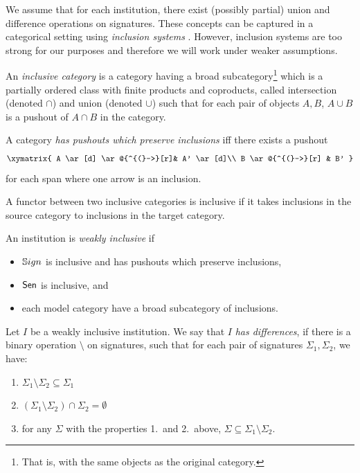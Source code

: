 \documentclass[10pt,fleqn,%
\ifpretendfinal
final%
\else
draft%
\fi,
]{scrreprt}
\begin{document}
We assume that for each institution, there exist (possibly partial) union and difference operations on signatures.
These concepts can be captured in a categorical setting using \emph{inclusion systems} \cite{Diaconescu1993}.
However, inclusion systems are too strong for our purposes and therefore we will work under weaker assumptions.

\begin{definition}  
 An \emph{inclusive category} \cite{DBLP:conf/birthday/GoguenR04} 
 is a category having a broad subcategory\footnote{That is, with the same objects as the original category.}
which is a partially ordered class with finite products and coproducts, called intersection (denoted $\cap$) and union
(denoted $\cup$) such that for each pair of objects $A, B$, $A \cup B$ is a pushout of $A \cap B$ in the category.
 \end{definition}

\noindent
A category \emph{has pushouts which preserve inclusions} iff 
there exists a pushout
$$
\xymatrix{
  A  \ar[d] \ar@{^{(}->}[r]& A' \ar[d]\\
  B \ar@{^{(}->}[r] & B'
}
$$ for each span where one arrow is an inclusion.

A functor between two inclusive categories is inclusive if it takes inclusions in the source category to inclusions in the target category.

\begin{definition}
 An institution is \emph{weakly inclusive} if
   \begin{itemize}
     \item $\mathbb{S}ign$ is inclusive and has pushouts which preserve inclusions,
     \item $\mathsf{Sen}$ is inclusive, and
     \item each model category have a broad subcategory of inclusions.
   \end{itemize}
\end{definition}

Let $I$ be a weakly inclusive institution. We say that $I$  \emph{has differences}, if there is a binary operation $\setminus$ on signatures, 
such that for each pair of signatures 
$\Sigma_1, \Sigma_2$, we have:
\begin{enumerate}
  \item $\Sigma_1\setminus \Sigma_2 \subseteq \Sigma_1$
  \item $(\Sigma_1\setminus \Sigma_2) \cap \Sigma_2 = \emptyset$
   \item for any $\Sigma$ with the properties 1.\ and 2.\ above, $\Sigma \subseteq \Sigma_1\setminus \Sigma_2$.
\end{enumerate} 
  
\end{document}
